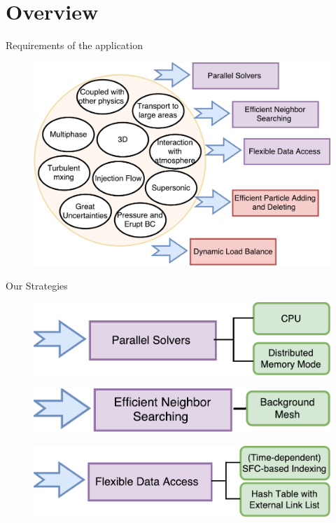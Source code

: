\documentclass{beamer}
\begin{document}
\section{Overview}
\begin{frame}{Requirements of the application}
\begin{figure}[!t]
\centering
\includegraphics[scale=0.43]{Requirement}
\label{fig:Requirements}
\end{figure}
\end{frame}

\begin{frame}{Our Strategies}
\begin{figure}
\flushleft
\includegraphics[scale=0.5]{Parallel}
\label{fig:Parallel}
\end{figure}
%
\begin{figure}
\flushleft
\includegraphics[scale=0.5]{NB_Search}
\label{fig:NB_Search}
\end{figure}
%
\begin{figure}
\flushleft
\includegraphics[scale=0.5]{Data_acc}
\label{fig:Data_acc}
\end{figure}
\end{frame}
\end{document}
